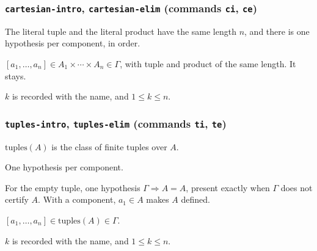 \subsubsection*{\texttt{cartesian-intro}, \texttt{cartesian-elim}
  (commands \texttt{ci}, \texttt{ce})}

\label{kop:cartesian-intro}%
\begin{VNBcond}
\item[Arity] The literal tuple and the literal product have the same
  length $n$, and there is one hypothesis per component, in order.
\end{VNBcond}
\label{kop:cartesian-elim}%
\begin{VNBcond}
\item[Assumption] $[a_1, \ldots, a_n] \in A_1 \times \cdots \times A_n
  \in \Gamma$, with tuple and product of the same length.  It stays.
\item[Index] $k$ is recorded with the name, and $1 \leq k \leq n$.
\end{VNBcond}

\subsubsection*{\texttt{tuples-intro}, \texttt{tuples-elim}
  (commands \texttt{ti}, \texttt{te})}

$\mathrm{tuples}(A)$ is the class of finite tuples over $A$.
\label{kop:tuples-intro}%
\begin{VNBcond}
\item[Arity] One hypothesis per component.
\item[Definedness] For the empty tuple, one hypothesis
  $\Gamma \Longrightarrow A = A$, present exactly when $\Gamma$ does not
  certify $A$.  With a component, $a_1 \in A$ makes $A$ defined.
\end{VNBcond}
\label{kop:tuples-elim}%
\begin{VNBcond}
\item[Assumption] $[a_1, \ldots, a_n] \in \mathrm{tuples}(A) \in \Gamma$.
\item[Index] $k$ is recorded with the name, and $1 \leq k \leq n$.
\end{VNBcond}

